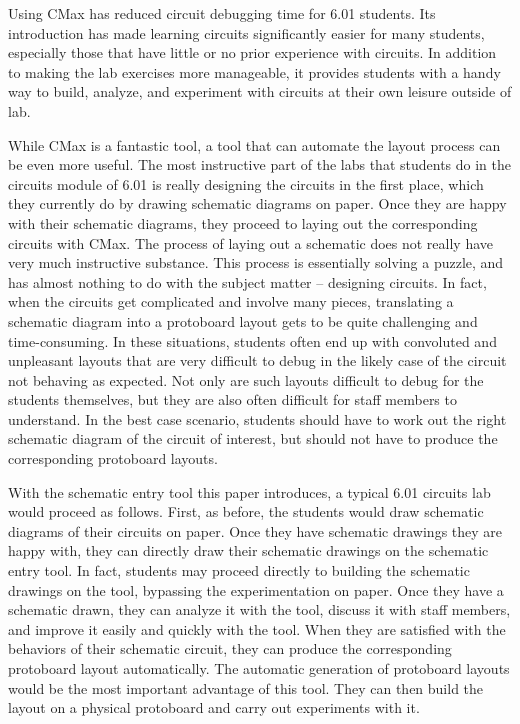 Using CMax has reduced circuit debugging time for 6.01 students.
Its introduction has made
learning circuits significantly easier for many students, especially those that
have little or no prior experience with circuits. In addition to making the lab
exercises more manageable, it provides students with a handy way to
build, analyze, and experiment with circuits at their own leisure outside of lab.

While CMax is a fantastic tool, a tool that can automate the layout process
can be even more useful. The most instructive part of the labs that students do
in the circuits
module of 6.01 is really designing the circuits in the first place, which they
currently do by drawing schematic diagrams on paper. Once they are happy with
their schematic diagrams, they proceed to laying out the corresponding circuits
with CMax. The process of laying out a schematic does not really have very much
instructive substance. This process is essentially solving a puzzle, and has
almost nothing to do with the subject matter -- designing circuits. In fact,
when the circuits get complicated and involve many pieces, translating a
schematic diagram into a protoboard layout gets to be quite challenging and
time-consuming. In these situations, students often end up with convoluted and
unpleasant layouts that are very difficult to debug in the likely case of the
circuit not behaving as expected. Not only are such layouts difficult to debug
for the students themselves, but they are also often difficult for staff
members to understand. In the best case scenario, students should have to work
out the right schematic diagram of the circuit of interest, but should not have
to produce the corresponding protoboard layouts.

With the schematic entry tool this paper introduces, a typical 6.01 circuits lab
would proceed as follows. First, as before, the students would draw schematic
diagrams of their circuits on paper. Once they have
schematic drawings they are happy with, they can directly draw their schematic
drawings on the schematic entry tool. In fact, students may proceed directly to
building the schematic drawings on the tool, bypassing the
experimentation on
paper. Once they have a schematic drawn, they can analyze it with the tool,
discuss it with staff members, and improve it easily and quickly with
the tool. When they are
satisfied with the behaviors of their schematic circuit, they can produce the
corresponding protoboard layout automatically. The automatic generation of
protoboard layouts would be
the most important advantage of this tool. They can then build the layout on a
physical protoboard and carry out experiments with it.

